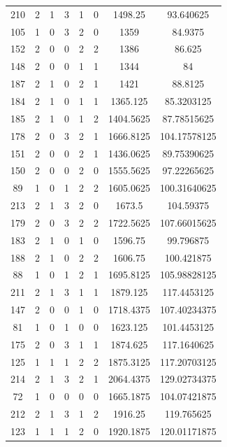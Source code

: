 \documentclass{article}
\begin{document}
\begin{table}[h!]
\begin{tabular}{c||c|c|c|c|c||c|c}
210 & 2 & 1 & 3 & 1 & 0 & 1498.25 & 93.640625 \\
105 & 1 & 0 & 3 & 2 & 0 & 1359 & 84.9375 \\
152 & 2 & 0 & 0 & 2 & 2 & 1386 & 86.625 \\
148 & 2 & 0 & 0 & 1 & 1 & 1344 & 84 \\
187 & 2 & 1 & 0 & 2 & 1 & 1421 & 88.8125 \\
184 & 2 & 1 & 0 & 1 & 1 & 1365.125 & 85.3203125 \\
185 & 2 & 1 & 0 & 1 & 2 & 1404.5625 & 87.78515625 \\
178 & 2 & 0 & 3 & 2 & 1 & 1666.8125 & 104.17578125 \\
151 & 2 & 0 & 0 & 2 & 1 & 1436.0625 & 89.75390625 \\
150 & 2 & 0 & 0 & 2 & 0 & 1555.5625 & 97.22265625 \\
89 & 1 & 0 & 1 & 2 & 2 & 1605.0625 & 100.31640625 \\
213 & 2 & 1 & 3 & 2 & 0 & 1673.5 & 104.59375 \\
179 & 2 & 0 & 3 & 2 & 2 & 1722.5625 & 107.66015625 \\
183 & 2 & 1 & 0 & 1 & 0 & 1596.75 & 99.796875 \\
188 & 2 & 1 & 0 & 2 & 2 & 1606.75 & 100.421875 \\
88 & 1 & 0 & 1 & 2 & 1 & 1695.8125 & 105.98828125 \\
211 & 2 & 1 & 3 & 1 & 1 & 1879.125 & 117.4453125 \\
147 & 2 & 0 & 0 & 1 & 0 & 1718.4375 & 107.40234375 \\
81 & 1 & 0 & 1 & 0 & 0 & 1623.125 & 101.4453125 \\
175 & 2 & 0 & 3 & 1 & 1 & 1874.625 & 117.1640625 \\
125 & 1 & 1 & 1 & 2 & 2 & 1875.3125 & 117.20703125 \\
214 & 2 & 1 & 3 & 2 & 1 & 2064.4375 & 129.02734375 \\
72 & 1 & 0 & 0 & 0 & 0 & 1665.1875 & 104.07421875 \\
212 & 2 & 1 & 3 & 1 & 2 & 1916.25 & 119.765625 \\
123 & 1 & 1 & 1 & 2 & 0 & 1920.1875 & 120.01171875 \\

	\end{tabular}
\end{table}
\end{document}

